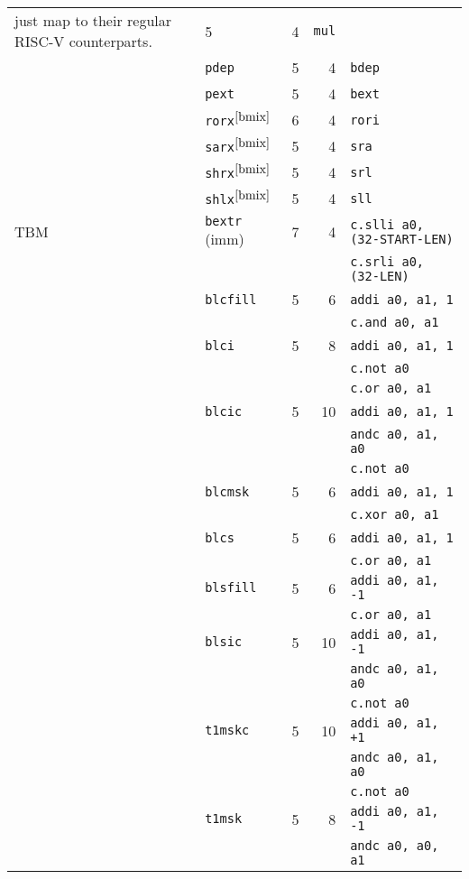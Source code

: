 \begin{longtable}[c]{@{}llrrl@{}}
{	 just map to their regular RISC-V counterparts.
                \label{bmix}} & 5 &  4 & {\tt mul}\tabularnewline
\cline{2-5}
     & {\tt pdep}             & 5 &  4 & {\tt bdep}\tabularnewline
\cline{2-5}
     & {\tt pext}             & 5 &  4 & {\tt bext}\tabularnewline
\cline{2-5}
     & {\tt rorx}$^{\ref{bmix}}$ & 6 &  4 & {\tt rori}\tabularnewline
\cline{2-5}
     & {\tt sarx}$^{\ref{bmix}}$ & 5 &  4 & {\tt sra}\tabularnewline
\cline{2-5}
     & {\tt shrx}$^{\ref{bmix}}$ & 5 &  4 & {\tt srl}\tabularnewline
\cline{2-5}
     & {\tt shlx}$^{\ref{bmix}}$ & 5 &  4 & {\tt sll}\tabularnewline
\midrule
TBM  & {\tt bextr} (imm)      & 7 &  4 & {\tt c.slli a0, (32-START-LEN)}\tabularnewline
     &                        &   &    & {\tt c.srli a0, (32-LEN)}\tabularnewline
\cline{2-5}
     & {\tt blcfill}          & 5 &  6 & {\tt addi a0, a1, 1}\tabularnewline
     &                        &   &    & {\tt c.and a0, a1}\tabularnewline
\cline{2-5}
     & {\tt blci}             & 5 &  8 & {\tt addi a0, a1, 1}\tabularnewline
     &                        &   &    & {\tt c.not a0}\tabularnewline
     &                        &   &    & {\tt c.or a0, a1}\tabularnewline
\cline{2-5}
     & {\tt blcic}            & 5 & 10 & {\tt addi a0, a1, 1}\tabularnewline
     &                        &   &    & {\tt andc a0, a1, a0}\tabularnewline
     &                        &   &    & {\tt c.not a0}\tabularnewline
\cline{2-5}
     & {\tt blcmsk}           & 5 &  6 & {\tt addi a0, a1, 1}\tabularnewline
     &                        &   &    & {\tt c.xor a0, a1}\tabularnewline
\cline{2-5}
     & {\tt blcs}             & 5 &  6 & {\tt addi a0, a1, 1}\tabularnewline
     &                        &   &    & {\tt c.or a0, a1}\tabularnewline
\cline{2-5}
     & {\tt blsfill}          & 5 &  6 & {\tt addi a0, a1, -1}\tabularnewline
     &                        &   &    & {\tt c.or a0, a1}\tabularnewline
\cline{2-5}
     & {\tt blsic}            & 5 & 10 & {\tt addi a0, a1, -1}\tabularnewline
     &                        &   &    & {\tt andc a0, a1, a0}\tabularnewline
     &                        &   &    & {\tt c.not a0}\tabularnewline
\cline{2-5}
     & {\tt t1mskc}           & 5 & 10 & {\tt addi a0, a1, +1}\tabularnewline
     &                        &   &    & {\tt andc a0, a1, a0}\tabularnewline
     &                        &   &    & {\tt c.not a0}\tabularnewline
\cline{2-5}
     & {\tt t1msk}            & 5 &  8 & {\tt addi a0, a1, -1}\tabularnewline
     &                        &   &    & {\tt andc a0, a0, a1}\tabularnewline
\bottomrule
\end{longtable}

